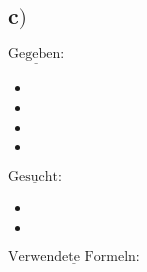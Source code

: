 \subsection*{c$)$}
\begin{minipage}[t]{0.33\textwidth}
	$\underline{\text{Gegeben:}}$
	\begin{itemize}
		\item 
		\item 
		\item 
		\item 
	\end{itemize}
\end{minipage}
\begin{minipage}[t]{0.33\textwidth}
	$\underline{\text{Gesucht:}}$
	\begin{itemize}
		\item 
		\item 
	\end{itemize}
\end{minipage}
\begin{minipage}[t]{0.33\textwidth}
	$\underline{\text{Verwendete Formeln:}}$
	\begin{equation}
	
	\end{equation}
	\begin{equation}
	
	\end{equation}
	\begin{equation}
	
	\end{equation}
\end{minipage}


